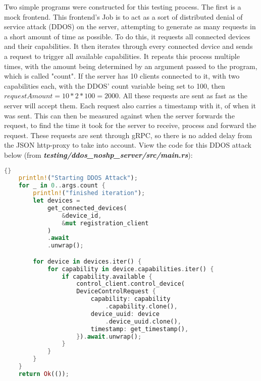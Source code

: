 Two simple programs were constructed for this testing process. The first is a mock frontend. This frontend's Job is to act as a sort of distributed denial of service attack (DDOS) on the server, attempting to generate as many requests in a short amount of time as possible. To do this, it requests all connected devices and their capabilities. It then iterates through every connected device and sends a request to trigger all available capabilities. It repeats this process multiple times, with the amount being determined by an argument passed to the program, which is called "count". If the server has 10 clients connected to it, with two capabilities each, with the DDOS' count variable being set to 100, then \(requestAmount = 10 * 2 * 100 = 2000\). All these requests are sent as fast as the server will accept them. Each request also carries a timestamp with it, of when it was sent. This can then be measured against when the server forwards the request, to find the time it took for the server to receive, process and forward the request. These requests are sent through gRPC, so there is no added delay from the JSON http-proxy to take into account. View the code for this DDOS attack below (from \textit{\textbf{testing/ddos\_noshp\_server/src/main.rs}}):
\begin{lstlisting}[language=Rust, style=boxed, showstringspaces=false]{}
    println!("Starting DDOS Attack");
    for _ in 0..args.count {
        println!("finished iteration");
        let devices = 
            get_connected_devices(
                &device_id, 
                &mut registration_client
            )
            .await
            .unwrap();

        for device in devices.iter() {
            for capability in device.capabilities.iter() {
                if capability.available {
                    control_client.control_device(
                    DeviceControlRequest {
                        capability: capability
                            .capability.clone(),
                        device_uuid: device
                            .device_uuid.clone(),
                        timestamp: get_timestamp(),
                    }).await.unwrap();
                }
            }
        }
    }
    return Ok(());
\end{lstlisting}

